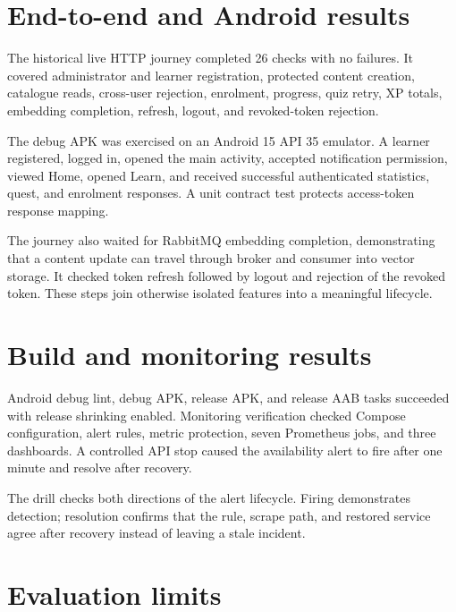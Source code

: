 \documentclass[12pt,a4paper,oneside]{report}
\begin{document}
\section{End-to-end and Android results}
The historical live HTTP journey completed 26 checks with no failures. It covered administrator
and learner registration, protected content creation, catalogue reads, cross-user
rejection, enrolment, progress, quiz retry, XP totals, embedding completion, refresh,
logout, and revoked-token rejection.

The debug APK was exercised on an Android 15 API 35 emulator. A learner registered,
logged in, opened the main activity, accepted notification permission, viewed Home,
opened Learn, and received successful authenticated statistics, quest, and enrolment
responses. A unit contract test protects access-token response mapping.

The journey also waited for RabbitMQ embedding completion, demonstrating that a
content update can travel through broker and consumer into vector storage. It checked
token refresh followed by logout and rejection of the revoked token. These steps join
otherwise isolated features into a meaningful lifecycle.

\section{Build and monitoring results}
Android debug lint, debug APK, release APK, and release AAB tasks succeeded with
release shrinking enabled. Monitoring verification checked Compose configuration,
alert rules, metric protection, seven Prometheus jobs, and three dashboards.
A controlled API stop caused the availability alert to fire after one minute and
resolve after recovery.

The drill checks both directions of the alert lifecycle. Firing demonstrates detection;
resolution confirms that the rule, scrape path, and restored service agree after
recovery instead of leaving a stale incident.

\section{Evaluation limits}
\end{document}
